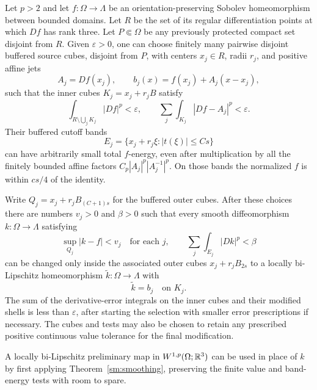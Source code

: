 \begin{proposition}
\label{hp:full-rank-correction}
Let $p>2$ and let $f:\Omega\to\Lambda$ be an orientation-preserving
Sobolev homeomorphism between bounded domains.  Let $R$ be the set
of its regular differentiation points at which $Df$ has rank three.
Let $P\Subset\Omega$ be any previously protected compact set
disjoint from $R$.  Given $\varepsilon>0$, one can choose finitely
many pairwise disjoint buffered source cubes, disjoint from $P$,
with centers $x_j\in R$, radii $r_j$, and positive affine jets
\[
 A_j=Df(x_j),\qquad
 b_j(x)=f(x_j)+A_j(x-x_j),
\]
such that the inner cubes $K_j=x_j+r_jB$ satisfy
\begin{equation}\label{hp:full-rank-core-tests}
 \int_{R\setminus\bigcup_jK_j}|Df|^p<\varepsilon,
 \qquad
 \sum_j\int_{K_j}|Df-A_j|^p<\varepsilon.
\end{equation}
Their buffered cutoff bands
\[
 E_j=\{x_j+r_j\xi:|t(\xi)|\leq Cs\}
\]
can have arbitrarily small total $f$-energy, even after multiplication
by all the finitely bounded affine factors
$C_p|A_j|^p|A_j^{-1}|^p$.  On those bands the normalized $f$ is
within $cs/4$ of the identity.

Write $Q_j=x_j+r_jB_{(C+1)s}$ for the buffered outer cubes.
After these choices there are numbers $v_j>0$ and $\beta>0$ such
that every smooth diffeomorphism $k:\Omega\to\Lambda$ satisfying
\[
 \sup_{Q_j}|k-f|<v_j\quad\text{for each }j,
 \qquad \sum_j\int_{E_j}|Dk|^p<\beta
\]
can be changed only inside the associated outer cubes
$x_j+r_jB_{2s}$ to a locally bi-Lipschitz homeomorphism
$\widetilde k:\Omega\to\Lambda$ with
\[
 \widetilde k=b_j\quad\text{on }K_j.
\]
The sum of the derivative-error integrals on the inner cubes and
their modified shells is less than $\varepsilon$, after starting the
selection with smaller error prescriptions if necessary.  The cubes
and tests may also be chosen to retain any prescribed positive
continuous value tolerance for the final modification.

A locally bi-Lipschitz preliminary map in $W^{1,p}(\Omega;\mathbb R^3)$
can be used in place of $k$ by first applying Theorem~\ref{sm:smoothing}, preserving the finite
value and band-energy tests with room to spare.
\end{proposition}

